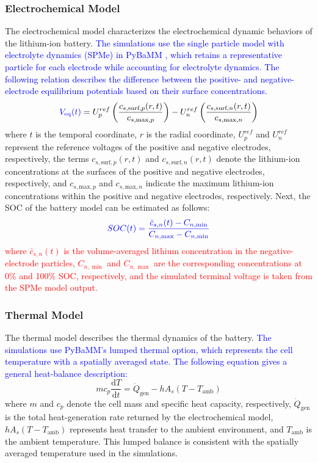\documentclass[journal]{IEEEtran}
\newcommand{\rev}[1]{\textcolor{blue}{#1}}
\newcommand{\newrev}[1]{\textcolor{red}{#1}}
\begin{document}
\subsubsection{Electrochemical Model}
The electrochemical model characterizes the electrochemical dynamic behaviors of the lithium-ion battery. \rev{The simulations use the single particle model with electrolyte dynamics (SPMe) in PyBaMM \cite{23,25}, which retains a representative particle for each electrode while accounting for electrolyte dynamics. The following relation describes the difference between the positive- and negative-electrode equilibrium potentials based on their surface concentrations.}
\begin{equation}\label{eqn:voltage}
    \rev{V_{\mathrm{eq}}(t)} = U^{ref}_{p} \left( \frac{c_{s,\text{surf},p}(r,t)}{c_{s,\text{max},p}} \right) - U^{ref}_{n} \left( \frac{c_{s,\text{surf},n}(r,t)}{c_{s,\text{max},n}} \right)
\end{equation}
where $t$ is the temporal coordinate, $r$ is the radial coordinate, $U^{ref}_{p}$ and $U^{ref}_{n}$ represent the reference voltages of the positive and negative electrodes, respectively, the terms \(c_{s,\text{surf},p}(r,t)\) and \(c_{s,\text{surf},n}(r,t)\) denote the lithium-ion concentrations at the surfaces of the positive and negative electrodes, respectively, and $c_{s,\text{max},p}$ and $c_{s,\text{max},n}$ indicate the maximum lithium-ion concentrations within the positive and negative electrodes, respectively. Next, the SOC of the battery model can be estimated as follows:
\begin{equation}
 \rev{SOC(t)= \frac{\bar{c}_{s,n}(t) - C_{n,\min}}{C_{n,\max} - C_{n,\min}}}
\end{equation}
\newrev{where $\bar{c}_{s,n}(t)$ is the volume-averaged lithium concentration in the negative-electrode particles, $C_{n,\min}$ and $C_{n,\max}$ are the corresponding concentrations at 0\% and 100\% SOC, respectively, and the simulated terminal voltage is taken from the SPMe model output.}

\subsubsection{Thermal Model}
The thermal model describes the thermal dynamics of the battery. \rev{The simulations use PyBaMM's lumped thermal option, which represents the cell temperature with a spatially averaged state. The following equation gives a general heat-balance description:}
{\color{red}
\begin{equation}\label{eqn:thermal}
    m c_p \frac{\mathrm{d}T}{\mathrm{d}t}=\dot{Q}_{\mathrm{gen}}-hA_s\left(T-T_{\mathrm{amb}}\right)
\end{equation}
where $m$ and $c_p$ denote the cell mass and specific heat capacity, respectively, $\dot{Q}_{\mathrm{gen}}$ is the total heat-generation rate returned by the electrochemical model, $hA_s\left(T-T_{\mathrm{amb}}\right)$ represents heat transfer to the ambient environment, and $T_{\mathrm{amb}}$ is the ambient temperature. This lumped balance is consistent with the spatially averaged temperature used in the simulations.
}
\end{document}
